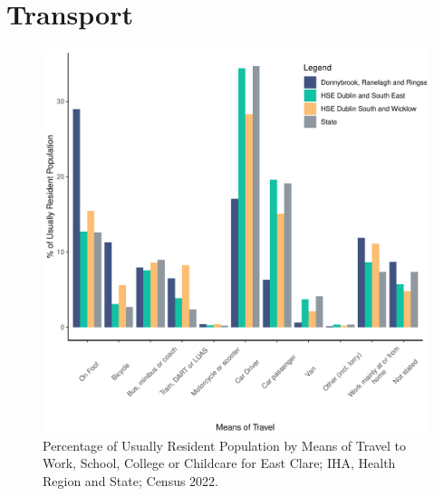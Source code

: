 \documentclass{article}
\begin{document}
\section{Transport}\label{sect:Trans}
\begin{figure}[H]
	\centering
	\includegraphics[width = 120mm]{../figures/TravelED.pdf}
	\caption{Percentage of Usually Resident Population by Means of Travel to Work, School, College or Childcare for East Clare; IHA, Health Region and State; Census 2022.}
	\label{fig:vbnv}
	\end{figure}
\end{document}
